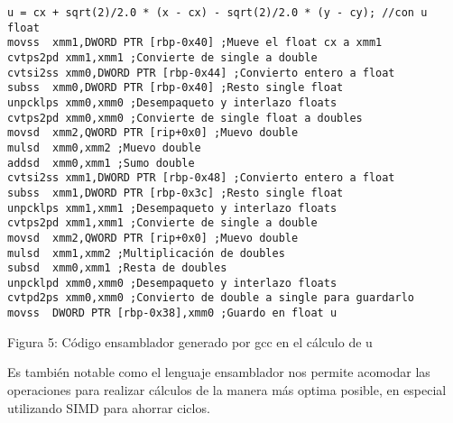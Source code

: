 \begin{lstlisting}
u = cx + sqrt(2)/2.0 * (x - cx) - sqrt(2)/2.0 * (y - cy); //con u float
movss  xmm1,DWORD PTR [rbp-0x40] ;Mueve el float cx a xmm1
cvtps2pd xmm1,xmm1 ;Convierte de single a double
cvtsi2ss xmm0,DWORD PTR [rbp-0x44] ;Convierto entero a float
subss  xmm0,DWORD PTR [rbp-0x40] ;Resto single float
unpcklps xmm0,xmm0 ;Desempaqueto y interlazo floats
cvtps2pd xmm0,xmm0 ;Convierte de single float a doubles
movsd  xmm2,QWORD PTR [rip+0x0] ;Muevo double
mulsd  xmm0,xmm2 ;Muevo double
addsd  xmm0,xmm1 ;Sumo double
cvtsi2ss xmm1,DWORD PTR [rbp-0x48] ;Convierto entero a float
subss  xmm1,DWORD PTR [rbp-0x3c] ;Resto single float
unpcklps xmm1,xmm1 ;Desempaqueto y interlazo floats
cvtps2pd xmm1,xmm1 ;Convierte de single a double
movsd  xmm2,QWORD PTR [rip+0x0] ;Muevo double
mulsd  xmm1,xmm2 ;Multiplicación de doubles
subsd  xmm0,xmm1 ;Resta de doubles
unpcklpd xmm0,xmm0 ;Desempaqueto y interlazo floats
cvtpd2ps xmm0,xmm0 ;Convierto de double a single para guardarlo
movss  DWORD PTR [rbp-0x38],xmm0 ;Guardo en float u
\end{lstlisting}

Figura 5: Código ensamblador generado por gcc en el cálculo de u

Es también notable como el lenguaje ensamblador nos permite acomodar las operaciones para realizar cálculos de la manera más optima posible, en especial utilizando SIMD para ahorrar ciclos.